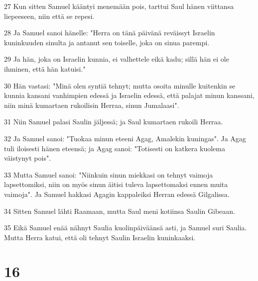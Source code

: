 \par 27 Kun sitten Samuel kääntyi menemään pois, tarttui Saul hänen viittansa liepeeseen, niin että se repesi.
\par 28 Ja Samuel sanoi hänelle: "Herra on tänä päivänä reväissyt Israelin kuninkuuden sinulta ja antanut sen toiselle, joka on sinua parempi.
\par 29 Ja hän, joka on Israelin kunnia, ei valhettele eikä kadu; sillä hän ei ole ihminen, että hän katuisi."
\par 30 Hän vastasi: "Minä olen syntiä tehnyt; mutta osoita minulle kuitenkin se kunnia kansani vanhimpien edessä ja Israelin edessä, että palajat minun kanssani, niin minä kumartaen rukoilisin Herraa, sinun Jumalaasi".
\par 31 Niin Samuel palasi Saulin jäljessä; ja Saul kumartaen rukoili Herraa.
\par 32 Ja Samuel sanoi: "Tuokaa minun eteeni Agag, Amalekin kuningas". Ja Agag tuli iloisesti hänen eteensä; ja Agag sanoi: "Totisesti on katkera kuolema väistynyt pois".
\par 33 Mutta Samuel sanoi: "Niinkuin sinun miekkasi on tehnyt vaimoja lapsettomiksi, niin on myös sinun äitisi tuleva lapsettomaksi ennen muita vaimoja". Ja Samuel hakkasi Agagin kappaleiksi Herran edessä Gilgalissa.
\par 34 Sitten Samuel lähti Raamaan, mutta Saul meni kotiinsa Saulin Gibeaan.
\par 35 Eikä Samuel enää nähnyt Saulia kuolinpäiväänsä asti, ja Samuel suri Saulia. Mutta Herra katui, että oli tehnyt Saulin Israelin kuninkaaksi.

\chapter{16}

